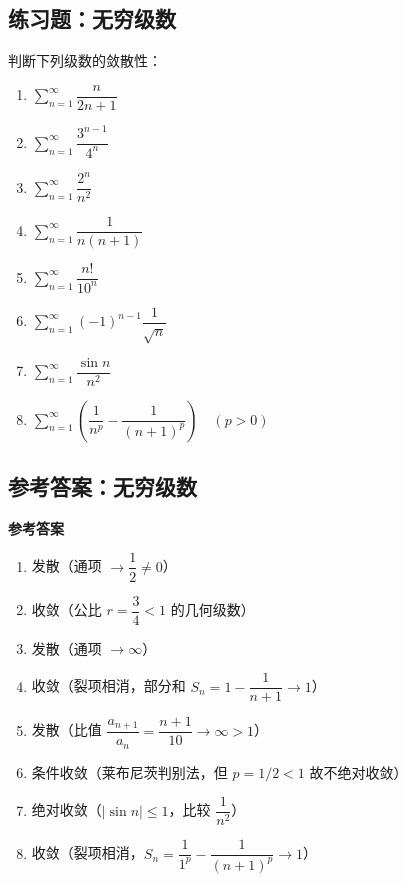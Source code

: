 \documentclass[fontset=fandol]{ctexart}
\newenvironment{custom}[1]{\par\noindent\textbf{#1}\quad}{\par\vspace{0.8em}}
\begin{document}
\subsection*{练习题：无穷级数}
\begin{exercise}[级数练习题]
判断下列级数的敛散性：

\begin{enumerate}
\item \(\sum_{n=1}^{\infty} \dfrac{n}{2n+1}\)
\item \(\sum_{n=1}^{\infty} \dfrac{3^{n-1}}{4^n}\)
\item \(\sum_{n=1}^{\infty} \dfrac{2^n}{n^2}\)
\item \(\sum_{n=1}^{\infty} \dfrac{1}{n(n+1)}\)
\item \(\sum_{n=1}^{\infty} \dfrac{n!}{10^n}\)
\item \(\sum_{n=1}^{\infty} (-1)^{n-1} \dfrac{1}{\sqrt{n}}\)
\item \(\sum_{n=1}^{\infty} \dfrac{\sin n}{n^2}\)
\item \(\sum_{n=1}^{\infty} \left(\dfrac{1}{n^p} - \dfrac{1}{(n+1)^p}\right) \quad (p>0)\)
\end{enumerate}
\end{exercise}

\subsection*{参考答案：无穷级数}
\begin{custom}{参考答案}
\begin{enumerate}
\item 发散（通项 \(\to \dfrac12 \neq 0\)）
\item 收敛（公比 \(r = \dfrac34 < 1\) 的几何级数）
\item 发散（通项 \(\to \infty\)）
\item 收敛（裂项相消，部分和 \(S_n = 1 - \dfrac{1}{n+1} \to 1\)）
\item 发散（比值 \(\dfrac{a_{n+1}}{a_n} = \dfrac{n+1}{10} \to \infty > 1\)）
\item 条件收敛（莱布尼茨判别法，但 \(p=1/2 < 1\) 故不绝对收敛）
\item 绝对收敛（\(|\sin n| \leq 1\)，比较 \(\dfrac{1}{n^2}\)）
\item 收敛（裂项相消，\(S_n = \dfrac{1}{1^p} - \dfrac{1}{(n+1)^p} \to 1\)）
\end{enumerate}
\end{custom}
\end{document}
